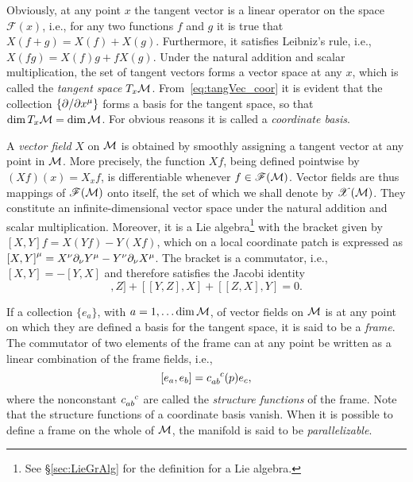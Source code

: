 \documentclass[
final,
11pt,
a4paper,
DIV=11,
headinclude=true,
footinclude=false,
bibliography=totoc,
twoside=true,  %
BCOR=5mm
]{scrbook}
\begin{document}
Obviously, at any point $x$ the tangent vector is a linear 
operator on the space $\mathscr{F}(x)$, i.e., for any two 
functions $f$ and $g$ it is true that $X(f+g) = X(f) + X(g)$.  
Furthermore, it satisfies Leibniz's rule, i.e., $X(fg) = X(f)g + 
fX(g)$. Under the natural addition and scalar multiplication, the 
set of tangent vectors forms a vector space at any $x$, which is 
called the \emph{tangent space} $T_x \mathcal{M}$.  
From~\eqref{eq:tangVec_coor} it is evident that the collection 
$\{\partial/\partial x^\mu\}$ forms a basis for the tangent space, so that 
$\dim T_x\mathcal{M} = \dim \mathcal{M}$. For obvious reasons it is called 
a \emph{coordinate basis}.

A \emph{vector field} $X$ on $\mathcal{M}$ is obtained by smoothly 
assigning a tangent vector at any point in $\mathcal{M}$. More 
precisely, the function $Xf$, being defined pointwise by $(Xf)(x) 
= X_x f$, is differentiable whenever $f \in \mathscr{F}(\mathcal{M})$.  
Vector fields are thus mappings of $\mathscr{F}(\mathcal{M})$ onto 
itself, the set of which we shall denote by 
$\mathscr{X}(\mathcal{M})$. They constitute an infinite-dimensional 
vector space under the natural addition and scalar 
multiplication.  Moreover, it is a Lie algebra\footnote{See 
  \S\ref{sec:LieGrAlg} for the definition for a Lie algebra.} 
with the bracket given by $[X,Y]f = X(Yf)-Y(Xf)$, which on 
a local coordinate patch is expressed as ${[X,Y]}^\mu = X^\nu 
\partial_\nu Y^\mu - Y^\nu \partial_\nu X^\mu$. The bracket is 
a commutator, i.e., $[X,Y] = -[Y,X]$ and therefore satisfies the 
Jacobi identity
\begin{equation*}
  [[X,Y],Z] + [[Y,Z],X] + [[Z,X],Y] = 0.
\end{equation*}

If a collection $\{e_a\}$, with $a = 1,\ldots \dim\mathcal{M}$, of 
vector fields on $\mathcal{M}$ is at any point on which they are 
defined a basis for the tangent space, it is said to be 
a \emph{frame}.  The commutator of two elements of the frame can 
at any point be written as a linear combination of the frame 
fields, i.e.,
\begin{equation}
\label{eq:frame_manifold}
  [e_a,e_b] = c\ind{_{ab}^c}(p) e_c,
\end{equation}
where the nonconstant $c\ind{_{ab}^c}$ are called the 
\emph{structure functions} of the frame. Note that the structure 
functions of a coordinate basis vanish. When it is possible to 
define a frame on the whole of $\mathcal{M}$, the manifold is said to 
be \emph{parallelizable}.
\end{document}
